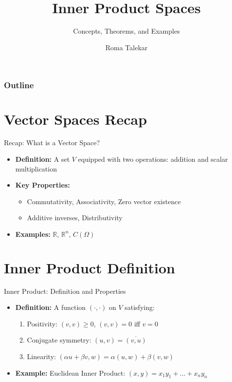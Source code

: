 \documentclass[
	aspectratio=169,    %
	onlytextwidth,        %
	t,                    %
]{beamer}
\title[Inner Product Spaces]{Inner Product Spaces}
\subtitle{Concepts, Theorems, and Examples}
\author[Roma Talekar]{Roma Talekar}
\begin{document}
\begin{frame}[plain]
    \titlepage
\end{frame}

\begin{frame}[plain]
    \frametitle{Outline}
    \tableofcontents
\end{frame}

\section{Vector Spaces Recap}
\begin{frame}{Recap: What is a Vector Space?}
    \begin{itemize}
        \item \textbf{Definition:} A set $V$ equipped with two operations: addition and scalar multiplication
        \item \textbf{Key Properties:}
        \begin{itemize}
            \item Commutativity, Associativity, Zero vector existence
            \item Additive inverses, Distributivity
        \end{itemize}
        \item \textbf{Examples:} $\mathbb{R}$, $\mathbb{R}^n$, $C(\Omega)$
    \end{itemize}
\end{frame}

\section{Inner Product Definition}
\begin{frame}{Inner Product: Definition and Properties}
    \begin{itemize}
        \item \textbf{Definition:} A function $(\cdot,\cdot)$ on $V$ satisfying:
        \begin{enumerate}
            \item Positivity: $(v,v) \geq 0$, $(v,v) = 0$ iff $v = 0$
            \item Conjugate symmetry: $(u,v) = \overline{(v,u)}$
            \item Linearity: $(\alpha u + \beta v, w) = \alpha (u,w) + \beta (v,w)$
        \end{enumerate}
        \item \textbf{Example:} Euclidean Inner Product: $(x,y) = x_1y_1 + \dots + x_ny_n$
    \end{itemize}
\end{frame}
\end{document}
